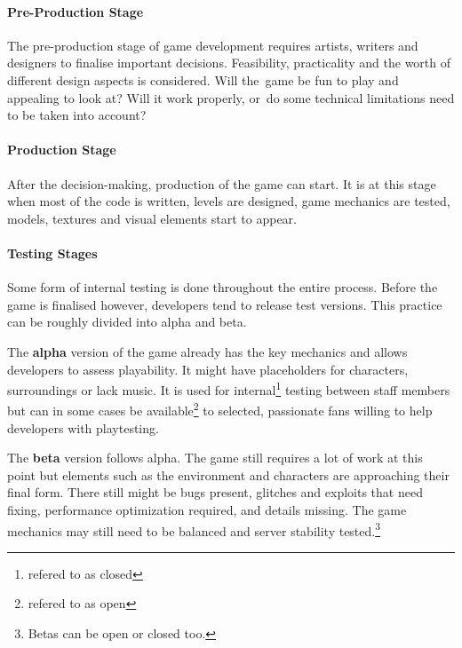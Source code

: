 \paragraph{Pre-Production Stage}
The pre-production stage of game development requires artists, writers and designers to finalise important decisions. Feasibility, practicality and the worth of different design aspects is considered. Will the~game be fun to play and appealing to look at? Will it work properly, or~do some technical limitations need to be taken into account?
\cite{bramble_7-stages, rocket_6-stages}

\paragraph{Production Stage}
After the decision-making, production of the game can start. It is at this stage when most of the code is written, levels are designed, game mechanics are tested, models, textures and visual elements start to appear.
\cite{bramble_7-stages, rocket_6-stages}

\paragraph{Testing Stages}
Some form of internal testing is done throughout the entire process. Before the game is finalised however, developers tend to release test versions. This practice can be roughly divided into alpha and beta.

The \textbf{alpha} version of the game already has the key mechanics and allows developers to assess playability. It might have placeholders for characters, surroundings or lack music. It is used for internal\footnote{refered to as closed} testing between staff members but can in some cases be available\footnote{refered to as open} to selected, passionate fans willing to help developers with playtesting.

The \textbf{beta} version follows alpha. The game still requires a lot of work at this point but elements such as the environment and characters are approaching their final form. There still might be bugs present, glitches and exploits that need fixing, performance optimization required, and details missing. The game mechanics may still need to be balanced and server stability tested.\footnote{Betas can be open or closed too.}
\cite{bramble_7-stages, rocket_6-stages, esler_viable-games}

